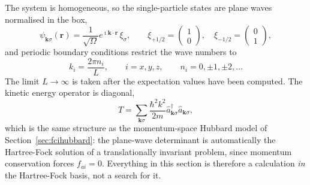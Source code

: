 The system is homogeneous, so the single-particle states are plane waves
normalised in the box,
\begin{equation}
  \psi_{\bm{k}\sigma}(\bm{r})
   = \frac{1}{\sqrt{\Omega}}e^{\imath\bm{k}\cdot\bm{r}}\,\xi_{\sigma},
  \qquad
  \xi_{+1/2}=\begin{pmatrix}1\\0\end{pmatrix},
  \quad
  \xi_{-1/2}=\begin{pmatrix}0\\1\end{pmatrix},
  \label{eq:6-planewave}
\end{equation}
and periodic boundary conditions restrict the wave numbers to
\begin{equation}
  k_i = \frac{2\pi n_i}{L},
  \qquad i=x,y,z,
  \qquad n_i = 0,\pm1,\pm2,\dots
  \label{eq:6-pbc}
\end{equation}
The limit $L\to\infty$ is taken after the expectation values have been
computed.  The kinetic energy operator is diagonal,
\begin{equation}
  \hat{T} = \sum_{\bm{k}\sigma}\frac{\hbar^2k^2}{2m}
    \hat{a}^{\dagger}_{\bm{k}\sigma}\hat{a}_{\bm{k}\sigma},
  \label{eq:6-kinetic}
\end{equation}
which is the same structure as the momentum-space Hubbard model of
Section~\ref{sec:fcihubbard}: the plane-wave determinant is automatically the
Hartree-Fock solution of a translationally invariant problem, since momentum
conservation forces $f_{ai}=0$.  Everything in this section is therefore a
calculation \emph{in} the Hartree-Fock basis, not a search for it.

